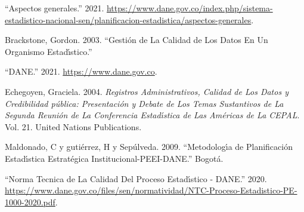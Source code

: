 \documentclass[
]{book}
\newlength{\cslhangindent}
\newlength{\cslentryspacingunit} %
\newenvironment{CSLReferences}[2] %
 {%
  \setlength{\parindent}{0pt}
  \ifodd #1
  \let\oldpar\par
  \def\par{\hangindent=\cslhangindent\oldpar}
  \fi
  \setlength{\parskip}{#2\cslentryspacingunit}
 }%
 {}
\begin{document}
\hypertarget{refs}{}
\begin{CSLReferences}{1}{0}
\leavevmode{}%
{``{Aspectos generales}.''} 2021. \url{https://www.dane.gov.co/index.php/sistema-estadistico-nacional-sen/planificacion-estadistica/aspectos-generales}.

\leavevmode{}%
Brackstone, Gordon. 2003. {``Gesti{ó}n de La Calidad de Los Datos En Un Organismo Estad{ı́}stico.''}

\leavevmode{}%
{``{DANE}.''} 2021. \url{https://www.dane.gov.co}.

\leavevmode{}%
Echegoyen, Graciela. 2004. \emph{Registros Administrativos, Calidad de Los Datos y Credibilidad p{ú}blica: Presentaci{ó}n y Debate de Los Temas Sustantivos de La Segunda Reuni{ó}n de La Conferencia Estad{ı́}stica de Las Am{é}ricas de La CEPAL}. Vol. 21. United Nations Publications.

\leavevmode{}%
Maldonado, C y gutiérrez, H y Sepúlveda. 2009. {``Metodolog{ı́}a de Planificaci{ó}n Estad{ı́}stica Estrat{é}gica Institucional-PEEI-DANE.''} Bogot{á}.

\leavevmode{}%
{``Norma Tecnica de La Calidad Del Proceso Estad{ı́}stico - DANE.''} 2020. \url{https://www.dane.gov.co/files/sen/normatividad/NTC-Proceso-Estadistico-PE-1000-2020.pdf}.

\end{CSLReferences}
\end{document}
